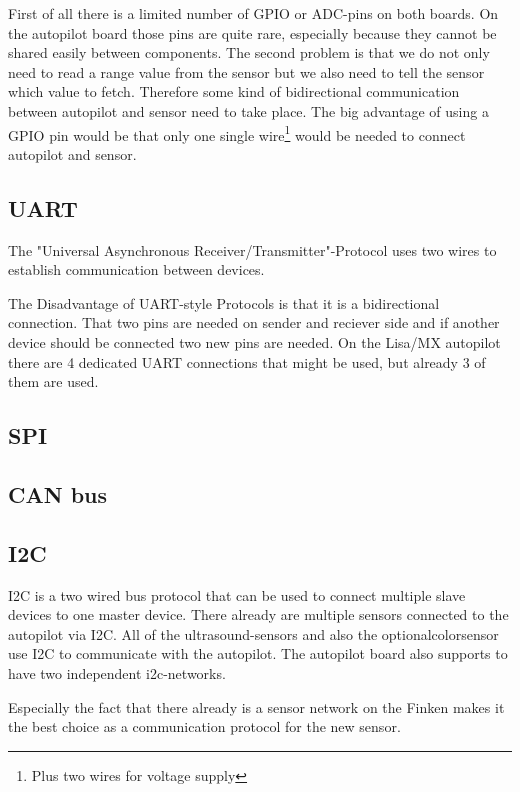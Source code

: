 First of all there is a limited number of GPIO or ADC-pins on both boards.
On the autopilot board those pins are quite rare, especially because they cannot be shared easily between components.
The second problem is that we do not only need to read a range value from the sensor but we also need to tell the sensor which value to fetch.
Therefore some kind of bidirectional communication between autopilot and sensor need to take place.
The big advantage of using a GPIO pin would be that only one single wire\footnote{Plus two wires for voltage supply} would be needed to connect autopilot and sensor.

\subsection{UART}
The "Universal Asynchronous Receiver/Transmitter"-Protocol uses two wires to establish communication between devices.
\cite{wingen_automatic_2004}

The Disadvantage of UART-style Protocols is that it is a bidirectional connection.
That two pins are needed on sender and reciever side and if another device should be connected two new pins are needed.
On the Lisa/MX autopilot there are 4 dedicated UART connections that might be used, but already 3 of them are used.

\subsection{SPI}

\subsection{CAN bus}

\subsection{I2C}
I2C is a two wired bus protocol that can be used to connect multiple slave devices to one master device.
There already are multiple sensors connected to the autopilot via I2C.
All of the ultrasound-sensors and also the optionalcolorsensor use I2C to communicate with the autopilot.
The autopilot board also supports to have two independent i2c-networks.

Especially the fact that there already is a sensor network on the Finken makes it the best choice as a communication protocol for the new sensor.


